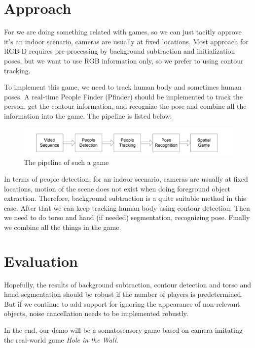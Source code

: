 \documentclass[conference,compsoc]{IEEEtran}
\begin{document}
\section{Approach}
	\par
		For we are doing something related with games, so we can just tacitly approve it's an indoor scenario, cameras are usually at fixed locations. Most approach for RGB-D requires pre-processing by background subtraction and initialization poses, but we want to use RGB information only, so we prefer to using contour tracking.
	\par
		To implement this game, we need to track human body and sometimes human poses. A real-time People Finder (Pfinder) should be implemented to track the person, get the contour information, and recognize the pose and combine all the information into the game. The pipeline is listed below:
	\par
		\begin{figure}[h]
			\centering
			\includegraphics[width=1\linewidth]{./Pic/pipeline}
			\caption{The pipeline of such a game}
		\end{figure}
		In terms of people detection, for an indoor scenario, cameras are usually at fixed locations, motion of the scene does not exist when doing foreground object extraction. Therefore, background subtraction is a quite suitable method in this case. After that we can keep tracking human body using contour detection. Then we need to do torso and hand (if needed) segmentation, recognizing pose. Finally we combine all the things in the game.
	\par
\section{Evaluation}
	\par
		Hopefully, the results of background subtraction, contour detection and torso and hand segmentation should be robust if the number of players is predetermined. But if we continue to add support for ignoring the appearance of non-relevant objects, noise cancellation needs to be implemented robustly.
	\par
		In the end, our demo will be a somatosensory game based on camera imitating the real-world game \textit{Hole in the Wall}.



\end{document}
